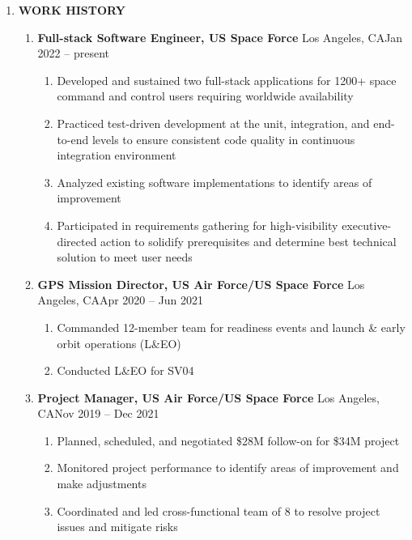 \documentclass[11pt]{article}
\begin{document}
\begin{center}
\begin{enumerate}[label={}, leftmargin=0pt, parsep=5pt]
    \item {\Large \textbf{WORK HISTORY}}
    \begin{enumerate}[label={}, itemsep=5pt]
        \item \textbf{Full-stack Software Engineer, US Space Force} \textbar{} Los Angeles, CA\hfill Jan 2022 -- present
        \begin{enumerate}[label={\textbf{-}}]
            \item Developed and sustained two full-stack applications for 1200+ space command and control users requiring worldwide availability
            \item Practiced test-driven development at the unit, integration, and end-to-end levels to ensure consistent code quality in continuous integration environment
            \item Analyzed existing software implementations to identify areas of improvement
            \item Participated in requirements gathering for high-visibility executive-directed action to solidify prerequisites and determine best technical solution to meet user needs
        \end{enumerate}
        \item \textbf{GPS Mission Director, US Air Force/US Space Force} \textbar{} Los Angeles, CA\hfill Apr 2020 -- Jun 2021
        \begin{enumerate}[label={$\cdot$}]
            \item Commanded 12-member team for readiness events and launch \& early orbit operations (L\&EO)
            \item Conducted L\&EO for SV04
        \end{enumerate}
        \item \textbf{Project Manager, US Air Force/US Space Force} \textbar{} Los Angeles, CA\hfill Nov 2019 -- Dec 2021
        \begin{enumerate}[label={{\boldmath$\cdot$}}]
            \item Planned, scheduled, and negotiated \$28M follow-on for \$34M project
            \item Monitored project performance to identify areas of improvement and make adjustments
            \item Coordinated and led cross-functional team of 8 to resolve project issues and mitigate risks

\end{enumerate}
\end{enumerate}
\end{enumerate}
\end{center}
\end{document}
